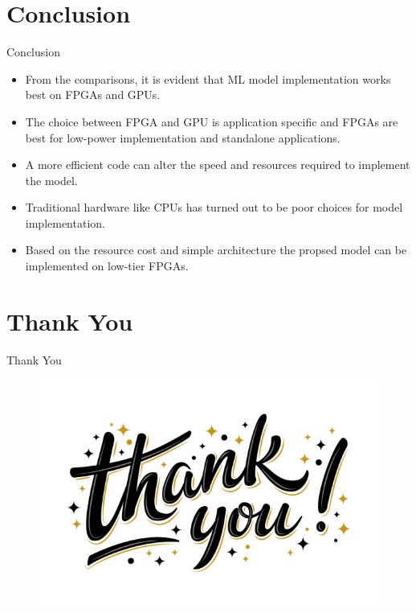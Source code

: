 \documentclass[10pt, a4paper]{beamer}
\begin{document}
\section{Conclusion}
\begin{frame}{Conclusion}
	\begin{itemize}
		\item  From the comparisons, it is evident that ML model implementation
	works best on FPGAs and GPUs.
		\item  The choice between FPGA and GPU is application specific and FPGAs are best for low-power implementation and standalone applications.
		\item  A more efficient code can alter the speed and resources required to implement the model.

		\item Traditional hardware like CPUs has turned out to be poor choices for model implementation.
		\item Based on the resource cost and simple architecture the propsed model can be implemented on low-tier FPGAs.
	\end{itemize}
\end{frame}

\section{Thank You}
\begin{frame}{Thank You}
	\begin{figure}
		\centering
		\includegraphics[scale=1.25]{thankyou}
	\end{figure}
\end{frame}
\end{document}

